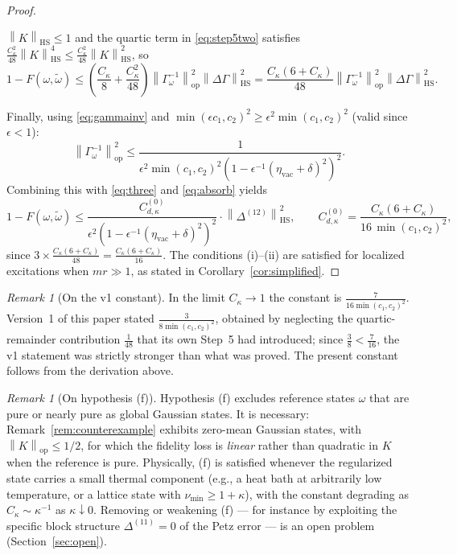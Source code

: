\documentclass[11pt,a4paper]{article}
\theoremstyle{plain}
\theoremstyle{definition}
\theoremstyle{remark}
\newtheorem{remark}[theorem]{Remark}
\newcommand{\opnorm}[1]{\left\lVert #1 \right\rVert_{\mathrm{op}}}
\newcommand{\hsnorm}[1]{\left\lVert #1 \right\rVert_{\mathrm{HS}}}
\newcommand{\etavac}{\eta_{\mathrm{vac}}}
\newcommand{\Ckappa}{C_{\kappa}}
\newcommand{\Cd}{C^{(0)}_{d,\kappa}}
\begin{document}
\begin{proof}
\begin{itemize}
$\hsnorm{K} \le 1$ and the quartic term in \eqref{eq:step5two} satisfies
$\frac{\Ckappa^2}{48}\hsnorm{K}^4 \le \frac{\Ckappa^2}{48}\hsnorm{K}^2$, so
\begin{equation}\label{eq:absorb}
1 - F(\omega, \tilde{\omega}) \le
\left(\frac{\Ckappa}{8} + \frac{\Ckappa^2}{48}\right)
\opnorm{\Gamma_\omega^{-1}}^2 \hsnorm{\Delta\Gamma}^2
= \frac{\Ckappa(6 + \Ckappa)}{48}
\opnorm{\Gamma_\omega^{-1}}^2 \hsnorm{\Delta\Gamma}^2.
\end{equation}
\end{itemize}
Finally, using \eqref{eq:gammainv} and
$\min(\epsilon c_1, c_2)^2 \ge \epsilon^2 \min(c_1, c_2)^2$ (valid since
$\epsilon < 1$):
\begin{equation}
\opnorm{\Gamma_\omega^{-1}}^2 \le
\frac{1}{\epsilon^2 \min(c_1,c_2)^2
\left(1 - \epsilon^{-1}(\etavac + \delta)^2\right)^2}.
\end{equation}
Combining this with \eqref{eq:three} and \eqref{eq:absorb} yields
\begin{equation}
1 - F(\omega, \tilde{\omega}) \le
\frac{\Cd}{\epsilon^2\left(1 - \epsilon^{-1}(\etavac + \delta)^2\right)^2}
\cdot \hsnorm{\Delta^{(12)}}^2,
\qquad
\Cd = \frac{\Ckappa(6+\Ckappa)}{16\,\min(c_1,c_2)^2},
\end{equation}
since $3 \times \frac{\Ckappa(6+\Ckappa)}{48} = \frac{\Ckappa(6+\Ckappa)}{16}$. The
conditions (i)--(ii) are satisfied for localized excitations when $mr \gg 1$, as
stated in Corollary~\ref{cor:simplified}.
\end{proof}

\begin{remark}[On the v1 constant]\label{rem:v1constant}
In the limit $\Ckappa \to 1$ the constant is
$\frac{7}{16\min(c_1,c_2)^2}$. Version~1 of this paper stated
$\frac{3}{8\min(c_1,c_2)^2}$, obtained by neglecting the quartic-remainder
contribution $\frac{1}{48}$ that its own Step~5 had introduced; since
$\frac{3}{8} < \frac{7}{16}$, the v1 statement was strictly stronger than what was
proved. The present constant follows from the derivation above.
\end{remark}

\begin{remark}[On hypothesis (f)]\label{rem:hypf}
Hypothesis (f) excludes reference states $\omega$ that are pure or nearly pure as
global Gaussian states. It is necessary: Remark~\ref{rem:counterexample} exhibits
zero-mean Gaussian states, with $\opnorm{K} \le 1/2$, for which the fidelity loss is
\emph{linear} rather than quadratic in $K$ when the reference is pure. Physically,
(f) is satisfied whenever the regularized state carries a small thermal component
(e.g., a heat bath at arbitrarily low temperature, or a lattice state with
$\nu_{\min} \ge 1 + \kappa$), with the constant degrading as
$\Ckappa \sim \kappa^{-1}$ as $\kappa \downarrow 0$. Removing or weakening (f) ---
for instance by exploiting the specific block structure $\Delta^{(11)} = 0$ of the
Petz error --- is an open problem (Section~\ref{sec:open}).
\end{remark}
\end{document}
